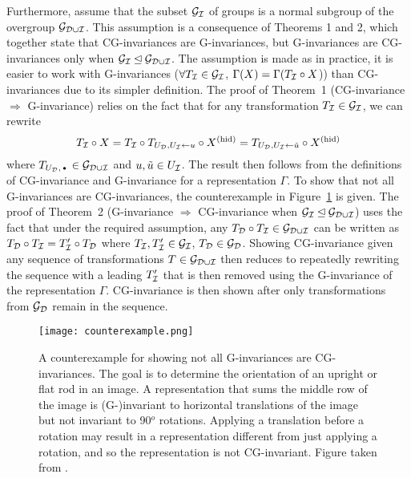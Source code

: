 Furthermore, \citeauthor{Mouli:2021} assume that the subset $\mathcal{G}_{\mathcal{I}}$ of groups is a normal subgroup of the overgroup $\mathcal{G}_{\mathcal{D}\cup\mathcal{I}}$. This assumption is a consequence of Theorems 1 and 2, which together state that CG-invariances are G-invariances, but G-invariances are CG-invariances only when $\mathcal{G}_{\mathcal{I}}\unlhd\mathcal{G}_{\mathcal{D}\cup\mathcal{I}}$. The assumption is made as in practice, it is easier to work with G-invariances ($\forall T_{\mathcal{I}}\in\mathcal{G}_{\mathcal{I}}$, $\Gamma(X)=\Gamma(T_{\mathcal{I}}\circ X$)) than CG-invariances due to its simpler definition. The proof of Theorem~1 (CG-invariance $\Rightarrow$ G-invariance) relies on the fact that for any transformation $T_{\mathcal{I}}\in\mathcal{G}_{\mathcal{I}}$, we can rewrite
\[
T_{\mathcal{I}}\circ X = T_{\mathcal{I}}\circ T_{U_{\mathcal{D}},U_{\mathcal{I}}\leftarrow u}\circ X^\text{(hid)} = T_{U_{\mathcal{D}},U_{\mathcal{I}}\leftarrow\tilde{u}}\circ X^\text{(hid)}
\]
where $T_{U_\calD,\argdot}\in\calG_{\calD\cup\calI}$ and $u,\tilde{u}\in U_{\mathcal{I}}$. The result then follows from the definitions of CG-invariance and G-invariance for a representation $\Gamma$. To show that not all G-invariances are CG-invariances, the counterexample in Figure~\ref{fig:counterexample} is given. The proof of Theorem~2 (G-invariance $\Rightarrow$ CG-invariance when $\mathcal{G}_{\mathcal{I}}\unlhd\mathcal{G}_{\mathcal{D}\cup\mathcal{I}}$) uses the fact that under the required assumption, any $T_{\mathcal{D}}\circ T_{\mathcal{I}} \in\mathcal{G}_{\mathcal{D}\cup\mathcal{I}}$ can be written as $T_{\mathcal{D}}\circ T_{\mathcal{I}}=T_{\mathcal{I}}'\circ T_{\mathcal{D}}$ where $T_{\mathcal{I}},T_{\mathcal{I}}'\in\mathcal{G}_{\mathcal{I}}$, $T_{\mathcal{D}}\in\mathcal{G}_{\mathcal{D}}$. Showing CG-invariance given any sequence of transformations $T\in\mathcal{G}_{\mathcal{D}\cup\mathcal{I}}$ then reduces to repeatedly rewriting the sequence with a leading $T_{\mathcal{I}}'$ that is then removed using the G-invariance of the representation $\Gamma$. CG-invariance is then shown after only transformations from $\mathcal{G}_{\mathcal{D}}$ remain in the sequence. 

\begin{figure}[H]
\centering
\texttt{[image: counterexample.png]}
\caption{A counterexample for showing not all G-invariances are CG-invariances. The goal is to determine the orientation of an upright or flat rod in an image. A representation that sums the middle row of the image is (G-)invariant to horizontal translations of the image but not invariant to 90$^o$ rotations. Applying a translation before a rotation may result in a representation different from just applying a rotation, and so the representation is not CG-invariant. Figure taken from \parencite{Mouli:2021}.}
\label{fig:counterexample}
\end{figure}

